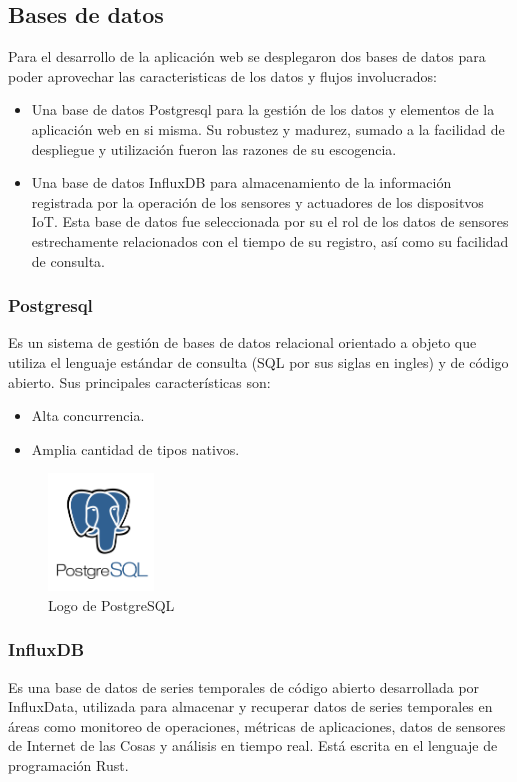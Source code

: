 \subsection{Bases de datos}
Para el desarrollo de la aplicación web se desplegaron dos bases de datos para poder aprovechar las caracteristicas de los datos y flujos involucrados:
\begin{itemize}
\item Una base de datos Postgresql para la gestión de los datos y elementos de la aplicación web en si misma. Su robustez y madurez, sumado a la facilidad de despliegue y utilización fueron las razones de su escogencia.
\item Una base de datos InfluxDB para almacenamiento de la información registrada por la operación de los sensores y actuadores de los dispositvos IoT. Esta base de datos fue seleccionada por su el rol de los datos de sensores estrechamente relacionados con el tiempo de su registro, así como su facilidad de consulta.
\end{itemize}

\subsubsection{Postgresql}
Es un sistema de gestión de bases de datos relacional orientado a objeto que utiliza el lenguaje estándar de consulta (SQL por sus siglas en ingles) y de código abierto. Sus principales características son:
\begin{itemize}
\item Alta concurrencia.
\item Amplia cantidad de tipos nativos.
\end{itemize}

\begin{figure}[ht]
\vspace*{-15pt}
\centering
\includegraphics[width=0.25\textwidth]{Figuras/postgresql_logo.png}
\caption{\label{fig:postgresql-logo}Logo de PostgreSQL}
\vspace*{-10pt}
\end{figure}

\subsubsection{InfluxDB}
Es una base de datos de series temporales de código abierto desarrollada por InfluxData, utilizada para almacenar y recuperar datos de series temporales en áreas como monitoreo de operaciones, métricas de aplicaciones, datos de sensores de Internet de las Cosas y análisis en tiempo real. Está escrita en el lenguaje de programación Rust.

